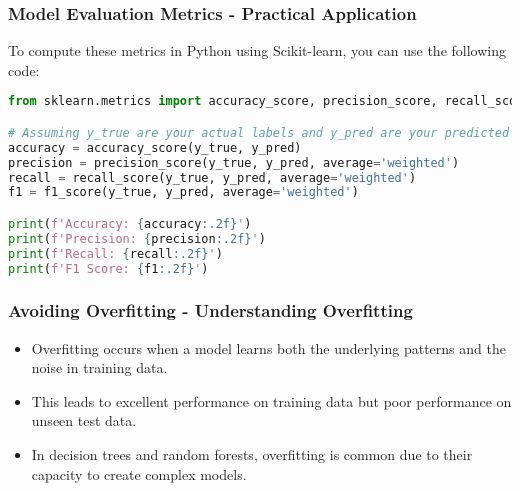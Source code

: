 \documentclass[aspectratio=169]{beamer}
\begin{document}
\begin{frame}[fragile]
    \frametitle{Model Evaluation Metrics - Practical Application}
    To compute these metrics in Python using Scikit-learn, you can use the following code:
    \begin{lstlisting}[language=Python]
from sklearn.metrics import accuracy_score, precision_score, recall_score, f1_score

# Assuming y_true are your actual labels and y_pred are your predicted labels
accuracy = accuracy_score(y_true, y_pred)
precision = precision_score(y_true, y_pred, average='weighted')
recall = recall_score(y_true, y_pred, average='weighted')
f1 = f1_score(y_true, y_pred, average='weighted')

print(f'Accuracy: {accuracy:.2f}')
print(f'Precision: {precision:.2f}')
print(f'Recall: {recall:.2f}')
print(f'F1 Score: {f1:.2f}')
    \end{lstlisting}
\end{frame}

\begin{frame}[fragile]
    \frametitle{Avoiding Overfitting - Understanding Overfitting}
    \begin{itemize}
        \item Overfitting occurs when a model learns both the underlying patterns and the noise in training data. 
        \item This leads to excellent performance on training data but poor performance on unseen test data.
        \item In decision trees and random forests, overfitting is common due to their capacity to create complex models.
    \end{itemize}
\end{frame}
\end{document}
